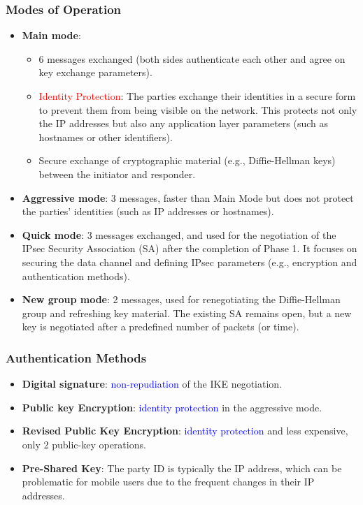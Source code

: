 \subsubsection{Modes of Operation}
\begin{itemize}
    \item \textbf{Main mode}:
    \begin{itemize}
        \item 6 messages exchanged (both sides authenticate each other and agree on key exchange parameters).
        \item \textcolor{red}{Identity Protection}: The parties exchange their identities in a secure form to prevent them from being visible on the network. This protects not only the IP addresses but also any application layer parameters (such as hostnames or other identifiers).
        \item Secure exchange of cryptographic material (e.g., Diffie-Hellman keys) between the initiator and responder.
    \end{itemize}
    \item \textbf{Aggressive mode}: 3 messages, faster than Main Mode but does not protect the parties' identities (such as IP addresses or hostnames). 
    \item \textbf{Quick mode}: 3 messages exchanged, and used for the negotiation of the IPsec Security Association (SA) after the completion of Phase 1. It focuses on securing the data channel and defining IPsec parameters (e.g., encryption and authentication methods).
    \item \textbf{New group mode}: 2 messages, used for renegotiating the Diffie-Hellman group and refreshing key material. The existing SA remains open, but a new key is negotiated after a predefined number of packets (or time).
\end{itemize}

\subsubsection{Authentication Methods}
\begin{itemize}
    \item \textbf{Digital signature}: \textcolor{Blue}{non-repudiation} of the IKE negotiation.
    \item \textbf{Public key Encryption}: \textcolor{Blue}{identity protection} in the aggressive mode.
    \item \textbf{Revised Public Key Encryption}: \textcolor{Blue}{identity protection} and less expensive, only 2 public-key operations.
    \item \textbf{Pre-Shared Key}: The party ID is typically the IP address, which can be problematic for mobile users due to the frequent changes in their IP addresses.
\end{itemize}

